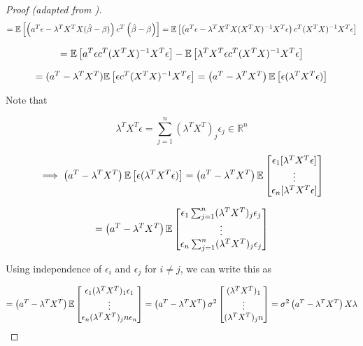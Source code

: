 \begin{proof}[Proof (adapted from \citet{faraway2002})]
\[
= \E \left[ \left( a^T \epsilon - \lambda^T X^T X( \hat{\beta} - \beta)  \right) c^T \left( \hat{\beta} - \beta \right)  \right] = \E \left[ \left( a^T \epsilon - \lambda^T X^T X (X^TX)^{-1} X^T \epsilon  \right) c^T (X^TX)^{-1} X^T \epsilon\right] 
\]

\[
=   \E \left[ a^T \epsilon c^T (X^TX)^{-1} X^T \epsilon \right]  -\E \left[  \lambda^T  X^T \epsilon   c^T (X^TX)^{-1} X^T \epsilon\right] 
\]

\[
=  (a^T - \lambda^T  X^T) \E \left[  \epsilon c^T (X^TX)^{-1} X^T \epsilon \right]   =  \left(a^T  -  \lambda^TX^T   \right) \E \left[  \epsilon (\lambda^T  X^T \epsilon) \right]  
\]

Note that 

\[
\lambda^T  X^T \epsilon = \sum_{j=1}^n (\lambda^T X^T)_j \epsilon_j \in \mathbb{R}^n
\]

\[
\implies \left(a^T  -  \lambda^TX^T   \right) \E \left[  \epsilon (\lambda^T  X^T \epsilon) \right]  =  \left(a^T  -  \lambda^TX^T   \right) \E  \begin{bmatrix}
  \epsilon_1 [\lambda^T  X^T \epsilon] \\
  \vdots \\
  \epsilon_n [\lambda^T  X^T \epsilon] 
  \end{bmatrix}
\]

\[
=  \left(a^T  -  \lambda^TX^T   \right) \E  \begin{bmatrix}
  \epsilon_1 \sum_{j=1}^n (\lambda^T X^T)_j \epsilon_j \\
  \vdots \\
  \epsilon_n \sum_{j=1}^n (\lambda^T X^T)_j \epsilon_j
  \end{bmatrix}
\]

Using independence of \(\epsilon_i\) and \(\epsilon_j\) for \(i \neq j\), we can write this as

\[
=  \left(a^T  -  \lambda^TX^T   \right) \E  \begin{bmatrix}
  \epsilon_1 (\lambda^T X^T)_1 \epsilon_1 \\
  \vdots \\
  \epsilon_n  (\lambda^T X^T)_jn \epsilon_n
  \end{bmatrix} =  \left(a^T  -  \lambda^TX^T   \right) \sigma^2 \begin{bmatrix}
(\lambda^T X^T)_1 \\
  \vdots \\
 (\lambda^T X^T)_jn
  \end{bmatrix} = \sigma^2 \left(a^T  -  \lambda^TX^T   \right) X \lambda
\]


\end{proof}

